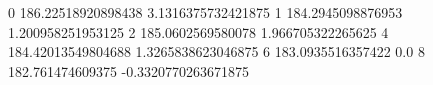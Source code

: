 0 186.22518920898438 3.1316375732421875
1 184.2945098876953 1.200958251953125
2 185.0602569580078 1.966705322265625
4 184.42013549804688 1.3265838623046875
6 183.0935516357422 0.0
8 182.761474609375 -0.3320770263671875
